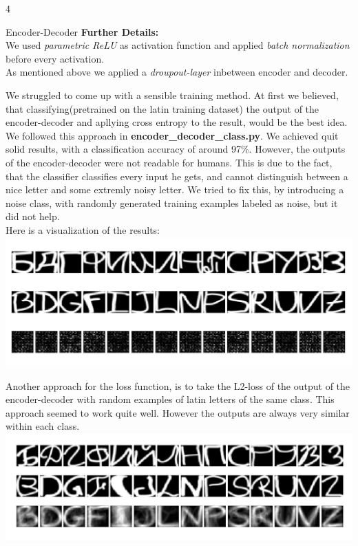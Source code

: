 \documentclass{article}
\begin{document}
\begin{ukon-infie}[28.1.18]{4}
\begin{exercise}[p=60]{Encoder-Decoder}
{		\textbf{Further Details:} \\
		We used \textit{parametric ReLU} as activation function and applied \textit{batch normalization} before every activation.\\
		As mentioned above we applied a \textit{droupout-layer} inbetween encoder and decoder.
		}
		\question{}
		{
		We struggled to come up with a sensible training method. At first we believed, that classifying(pretrained on the latin training dataset) the output of the encoder-decoder and apllying cross entropy to the result, would be the best idea. We followed this approach in \textbf{encoder\_decoder\_class.py}. We achieved quit solid results, with a classification accuracy of around 97\%. However, the outputs of the encoder-decoder were not readable for humans. This is due to the fact, that the classifier classifies every input he gets, and cannot distinguish between a nice letter and some extremly noisy letter. We tried to fix this, by introducing a noise class, with randomly generated training examples labeled as noise, but it did not help. \\
		Here is a visualization of the results:\\
		\includegraphics[scale=0.5]{encoder_decoder_class.png}
		
		
		Another approach for the loss function, is to take the L2-loss of the output of the encoder-decoder with random examples of latin letters of the same class. This approach seemed to work quite well. However the outputs are always very similar within each class.\\
		
		\includegraphics[scale=0.5]{encoder_decoder_random.png}
		
}
\end{exercise}
\end{ukon-infie}
\end{document}
